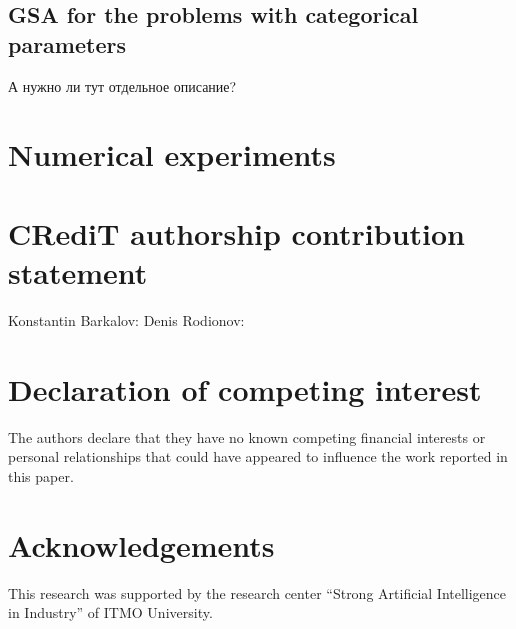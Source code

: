 \documentclass[preprint,12pt]{elsarticle}
\begin{document}
\subsection{GSA for the problems with categorical parameters}
\label{sec_mGSA}

А нужно ли тут отдельное описание?


\section{Numerical experiments}
\label{sec_exp}

\section*{CRediT authorship contribution statement}

Konstantin Barkalov:
Denis Rodionov: 


\section*{Declaration of competing interest}

The authors declare that they have no known competing financial interests or personal relationships that could have appeared to influence the work reported in this paper.

\section*{Acknowledgements}

This research was supported by the research center ``Strong Artificial Intelligence in Industry'' of ITMO University.





 






\end{document}
